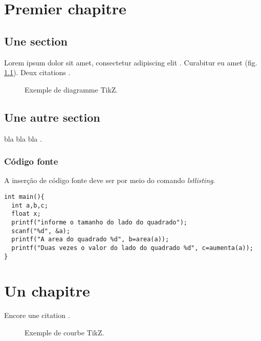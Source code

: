 \chapter{Premier chapitre}
\label{chap:premierchapitre_exemple}

\section{Une section}
Lorem ipsum dolor sit amet, consectetur adipiscing elit \cite{Roque2012,Roque2012b,Roque2012c,Roque2012d}. 
Curabitur eu amet (fig. \ref{fig:une-image}). Deux citations \cite{Arapoglou2011,Roque2013c}.

\begin{figure}[htp]
  \centering
  
  \caption{Exemple de diagramme TikZ.}
  \label{fig:une-image}
\end{figure}

\section{Une autre section}
 bla bla bla \cite{Thompson2013raey}.


\subsection{Código fonte}
A inserção de código fonte deve ser por meio do comando \textit{lstlisting}.

\begin{lstlisting}
int main(){
  int a,b,c;
  float x;
  printf("informe o tamanho do lado do quadrado");
  scanf("%d", &a);
  printf("A area do quadrado %d", b=area(a));
  printf("Duas vezes o valor do lado do quadrado %d", c=aumenta(a));
}
\end{lstlisting}


\chapter{Un chapitre}
\label{sec:unchapitre}


 Encore une citation \cite{Cadambe2008}.

\begin{figure}[htp!]
  \centering
  \setlength\figureheight{7cm}
  \setlength\figurewidth{9cm}
  
  \caption{Exemple de courbe TikZ.}
  \label{fig:courbe-tikz}
\end{figure}

